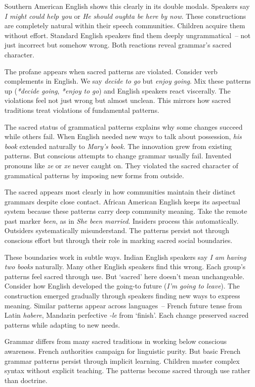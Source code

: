 Southern American English shows this clearly in its double modals. Speakers say \textit{I might could help you} or \textit{He should oughta be here by now}. These constructions are completely natural within their speech communities. Children acquire them without effort. Standard English speakers find them deeply ungrammatical~-- not just incorrect but somehow wrong. Both reactions reveal grammar's sacred character.

The profane appears when sacred patterns are violated. Consider verb complements in English. We say \textit{decide to go} but \textit{enjoy going}. Mix these patterns up (\textit{*decide going}, \textit{*enjoy to go}) and English speakers react viscerally. The violations feel not just wrong but almost unclean. This mirrors how sacred traditions treat violations of fundamental patterns.

The sacred status of grammatical patterns explains why some changes succeed while others fail. When English needed new ways to talk about possession, \textit{his book} extended naturally to \textit{Mary's book}. The innovation grew from existing patterns. But conscious attempts to change grammar usually fail. Invented pronouns like \textit{ze} or \textit{xe} never caught on. They violated the sacred character of grammatical patterns by imposing new forms from outside.

The sacred appears most clearly in how communities maintain their distinct grammars despite close contact. African American English keeps its aspectual system because these patterns carry deep community meaning. Take the remote past marker \textit{been}, as in \textit{She been married}. Insiders process this automatically. Outsiders systematically misunderstand. The patterns persist not through conscious effort but through their role in marking sacred social boundaries.

These boundaries work in subtle ways. Indian English speakers say \textit{I am having two books} naturally. Many other English speakers find this wrong. Each group's patterns feel sacred through use. But `sacred' here doesn't mean unchangeable. Consider how English developed the going-to future (\textit{I'm going to leave}). The construction emerged gradually through speakers finding new ways to express meaning. Similar patterns appear across languages~-- French future tense from Latin \textit{habere}, Mandarin perfective \textit{-le} from `finish'. Each change preserved sacred patterns while adapting to new needs.

Grammar differs from many sacred traditions in working below conscious awareness. French authorities campaign for linguistic purity. But basic French grammar patterns persist through implicit learning. Children master complex syntax without explicit teaching. The patterns become sacred through use rather than doctrine.

